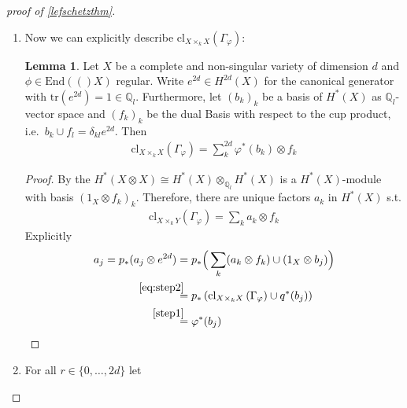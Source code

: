 \documentclass[english]{scrartcl}
\theoremstyle{definition}
\newtheorem{Lem}[Def]{Lemma}
\theoremstyle{remark}
\newcommand*{\Z}{\mathds{Z}}
\newcommand*{\Q}{\mathds{Q}}
\newcommand*{\Zl}{\Z_l} %
\newcommand*{\Ql}{\Q_l} %
\newcommand*{\End}[1]{\text{End}(#1)} %
\newcommand*{\id}{\text{id}} %
\newcommand*{\idest}{i.e.\ }
\newcommand*{\tr}[1]{\text{tr}\left(#1\right)} %
\newcommand*{\Graph}[1]{{\Gamma_{#1}}} %
\newcommand*{\cl}[2]{{\text{cl}_{#1}\left(#2\right)}} %
\newcommand*{\one}[1]{{1_{#1}}}%
\let\altphi\phi
\renewcommand*{\phi}{\varphi}
\begin{document}
\begin{proof}[proof of \autoref{lefschetzthm}]
\begin{enumerate}[label={Step \arabic*.}]
\begin{Lem}
\begin{proof}
\begin{align*}
            (p\circ\Graph{\phi})_* \left(
            \one{X} \cup (q\circ\Graph{\phi})^*(y) \right)\\
          &\overset{\mathllap{\text{Def. $\Graph\phi$}}}=
            \id_* \left( \one{X} \cup \phi^*(y) \right)\\
          &= \phi^*(y)
        \end{align*}
      \end{proof}
    \end{Lem}
  \item Now we can explicitly describe
    $\cl{X\times_k X}{\Graph{\phi}}$:
    \begin{Lem}
      Let $X$ be a complete and non-singular variety of dimension $d$
      and $\altphi\in\End(X)$ regular.
      Write $e^{2d}\in H^{2d}(X)$ for the canonical generator
      with $\tr{e^{2d}}=1\in\Ql$.
      Furthermore, let $(b_k)_k$ be a basis of $H^*(X)$ as
      $\Ql$-vector space and $(f_k)_k$ be the dual Basis with respect
      to the cup product, \idest $b_k\cup f_l=\delta_{kl}e^{2d}$.
      Then
      \begin{gather*}
        \cl{X\times_k X}{\Graph{\phi}} =
        \sum_{k}^{2d} \phi^*(b_k)\otimes  f_k
      \end{gather*}
      \begin{proof}
        By the  %
        $H^*(X\otimes X) \cong H^*(X)\otimes_{\Ql}H^*(X)$ is a
        $H^*(X)$-module with basis
        $(\one{X}\otimes f_k)_{k}$.
        Therefore, there are unique factors $a_{k}$ in $H^*(X)$ s.t.
        \begin{gather}
          \label{eq:step2}
        \cl{X\times_k Y}{\Graph{\phi}} =
        \sum_{k} a_k\otimes f_k
      \end{gather}
      Explicitly
      \begin{align*}
        a_j
        = p_*(a_j\otimes e^{2d})
        &= p_*\Big(
          \sum_k(a_k\otimes f_k)\cup (\one{X}\otimes b_j)
        \Big)\\
        &\overset{\mathllap{\eqref{eq:step2}}}= p_*\left(
          \cl{X\times_k X}{\Graph{\phi}} \cup q^*(b_j)
          \right)\\
        &\overset{\mathllap{\ref{step1}}}= \phi^*(b_j) 
      \end{align*}
      \end{proof}
    \end{Lem}
  \item
  For all $r\in\{0,\dotsc,2d\}$ let

\end{enumerate}
\end{proof}
\end{document}

